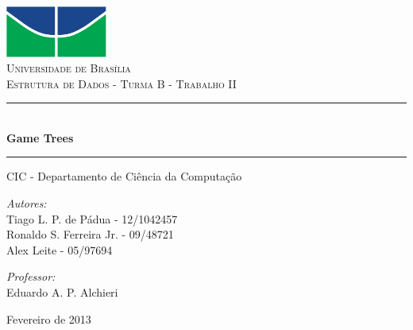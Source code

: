 \documentclass[a4paper,11pt]{article}
\newcommand{\HRule}{\rule{\linewidth}{0.5mm}}
\begin{document}
\begin{titlepage}
\begin{center}
 
\includegraphics[width=0.25\textwidth]{./unb.pdf}\\[1cm]
 
\textsc{\LARGE Universidade de Brasília}\\[1.5cm]
 
\textsc{\Large Estrutura de Dados - Turma B - Trabalho II}\\[0.5cm]
 
\HRule \\[0.4cm]
{ \huge \bfseries Game Trees}
\HRule
\vspace{0.75cm}
\large CIC - Departamento de Ciência da Computação\\
\vspace{0.8cm}
\begin{minipage}{0.4\textwidth}
\begin{flushleft} \large
\emph{Autores:}\\
Tiago L. P. de Pádua - 12/1042457\\
Ronaldo S. Ferreira Jr. - 09/48721\\
Alex Leite - 05/97694\\
\end{flushleft}
\end{minipage}
\begin{minipage}{0.4\textwidth}
\begin{flushright} \large
\emph{Professor:} \\
Eduardo A. P. Alchieri
\end{flushright}
\end{minipage}
 
\vfill
 
{\large Fevereiro de 2013}
\end{center}
\end{titlepage}

\pagestyle{plain}

\end{document}
